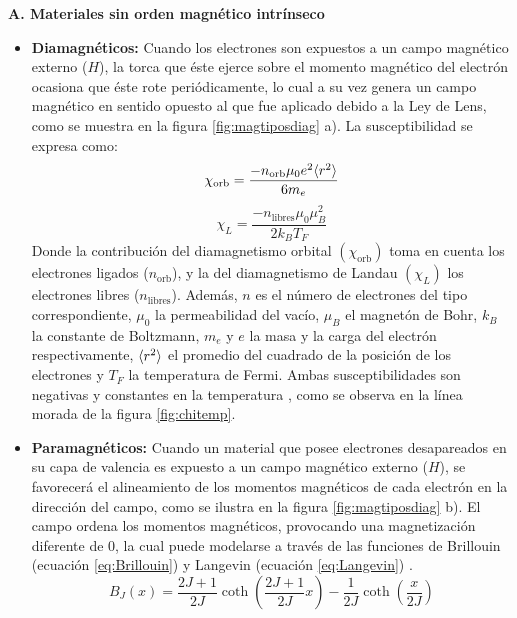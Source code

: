 \documentclass[../main.tex]{subfiles}
\begin{document}
\textbf{A. Materiales sin orden magnético intrínseco}
\begin{itemize}
    \item \textbf{Diamagnéticos:} Cuando los electrones son expuestos a un campo magnético externo ($H$), la torca que éste ejerce sobre el momento magnético del electrón ocasiona que éste rote periódicamente, lo cual a su vez genera un campo magnético en sentido opuesto al que fue aplicado debido a la Ley de Lens, como se muestra en la figura \ref{fig:magtiposdiag} a). La susceptibilidad se expresa como:
    \begin{equation}
        \chi_{\text{orb}}=\dfrac{-n_{\text{orb}}\mu_0e^2\langle r^2 \rangle}{6m_e}
        \label{eq:chidiamagorb}
    \end{equation}
    \begin{equation}
        \chi_L=\dfrac{-n_\text{libres}\mu_0\mu_B^2}{2k_BT_F}
        \label{eq:chidiamaglandau}
    \end{equation}
    Donde la contribución del diamagnetismo orbital $(\chi_\text{orb})$ toma en cuenta los electrones ligados ($n_\text{orb}$), y la del diamagnetismo de Landau $(\chi_L)$ los electrones libres ($n_\text{libres}$). Además, $n$ es el número de electrones del tipo correspondiente, $\mu_0$ la permeabilidad del vacío, $\mu_B$ el magnetón de Bohr, $k_B$ la constante de Boltzmann, $m_e$ y $e$ la masa y la carga del electrón respectivamente, $\langle r^2 \rangle$ el promedio del cuadrado de la posición de los electrones y $T_F$ la temperatura de Fermi. Ambas susceptibilidades son negativas y constantes en la temperatura \cite{coey2010magnetism}, como se observa en la línea morada de la figura \ref{fig:chitemp}.
    \item \textbf{Paramagnéticos:} Cuando un material que posee electrones desapareados en su capa de valencia es expuesto a un campo magnético externo ($H$), se favorecerá el alineamiento de los momentos magnéticos de cada electrón en la dirección del campo, como se ilustra en la figura \ref{fig:magtiposdiag} b). El campo ordena los momentos magnéticos, provocando una magnetización diferente de 0, la cual puede modelarse a través de las funciones de Brillouin (ecuación \ref{eq:Brillouin}) y Langevin (ecuación \ref{eq:Langevin}) \cite{coey2010magnetism}.
    \begin{equation}
        B_J(x)=\dfrac{2J+1}{2J}\coth\left(\dfrac{2J+1}{2J}x\right)-\dfrac{1}{2J}\coth\left(\dfrac{x}{2J}\right)
        \label{eq:Brillouin}
    \end{equation}
    \begin{equation}

\end{equation}
\end{itemize}
\end{document}

